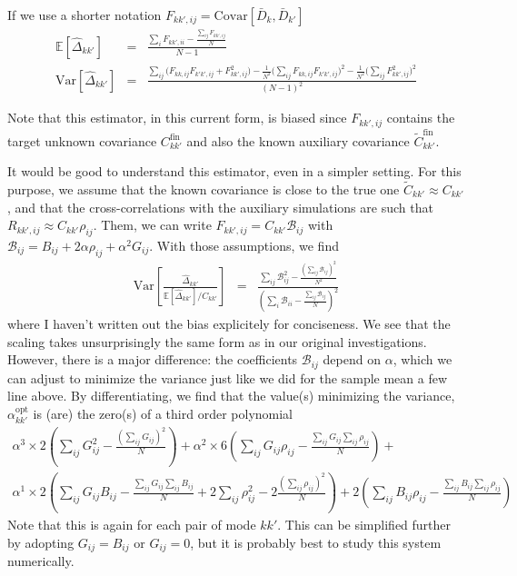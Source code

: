 \documentclass{aastex6}
\newcommand{\eqn}[1]{\begin{eqnarray}#1\end{eqnarray}}
\begin{document}
If we use a shorter notation $F_{kk',ij} = \mathrm{Covar}[\bar{D}_{k}, \bar{D}_{k'}]$
\eqn{
	\mathbb{E}[\hat{\Delta}_{kk'}] &=&  \frac{ \sum_{i}F_{kk',ii} - \frac{\sum_{ij} F_{kk',ij}}{N} } {N-1}	 \\	
	 \mathrm{Var}\left[ \hat{\Delta}_{kk'}\right]  &=&	\frac{\sum_{ij} \bigl(F_{kk,ij}F_{k'k',ij} + F_{kk',ij}^2 \bigr) - \frac{1}{N^2}\bigl( \sum_{ij}F_{kk,ij}F_{k'k',ij} \bigr)^2 - \frac{1}{N^2}\bigl( \sum_{ij}F^2_{kk',ij} \bigr)^2 }{(N-1)^2}	
	}
	
	Note that this estimator, in this current form, is biased since  $F_{kk',ij}$ contains the target unknown covariance ${C}_{kk'}^\mathrm{fin}$ and also the known auxiliary covariance $\tilde{C}_{kk'}^\mathrm{fin}$.
	
It would be good to understand this estimator, even in a simpler setting. For this purpose, we assume that the known covariance is close to the true one $\tilde{C}_{kk'} \approx {C}_{kk'}$, and that the cross-correlations with the auxiliary simulations are such that $R_{kk',ij} \approx {C}_{kk'} \rho_{ij}$.
Them, we can write $F_{kk',ij} ={C}_{kk'}  \mathcal{B}_{ij}$ with $\mathcal{B}_{ij} = B_{ij} + 2 \alpha \rho_{ij} + \alpha^2 G_{ij}$. 
With those assumptions, we find
\eqn{
	 \mathrm{Var}\left[ \frac{\hat{\Delta}_{kk'}}{\mathbb{E}[\hat{\Delta}_{kk'}] /{C}_{kk'} }\right]  &=&  \frac{ \sum_{ij} \mathcal{B}_{ij}^2  - \frac{\left(\sum_{ij}\mathcal{B}_{ij}\right)^2}{N^2}}{ \left(\sum_i \mathcal{B}_{ii} - \frac{\sum_{ij}\mathcal{B}_{ij}}{N}\right)^2 }
	}
where I haven't written out the bias explicitely for conciseness. 	
We see that the scaling takes unsurprisingly the same form as in our original investigations. However, there is a major difference: the coefficients $\mathcal{B}_{ij}$ depend on $\alpha$, which we can adjust to minimize the variance just like we did for the sample mean a few line above.
By differentiating, we find that the value(s) minimizing the variance, ${\alpha^\mathrm{opt}_{kk'}}$ is (are) the zero(s) of a third order polynomial
\eqn{
	 \alpha^3  \times 2 \left(  \sum_{ij} G_{ij}^2 - \frac{(\sum_{ij} G_{ij})^2}{N}\right) + 
	  \alpha^2 \times 6 \left(  \sum_{ij} G_{ij} \rho_{ij} - \frac{\sum_{ij} G_{ij} \sum_{ij} \rho_{ij}}{N} \right) + \\ 
	  \alpha^1 \times 2 \left(  \sum_{ij} G_{ij} B_{ij} - \frac{\sum_{ij} G_{ij} \sum_{ij} B_{ij}}{N}  + 2 \sum_{ij} \rho^2_{ij} - 2\frac{(\sum_{ij}  \rho_{ij})^2}{N}  \right) + 
	    2 \left(  \sum_{ij} B_{ij} \rho_{ij} - \frac{\sum_{ij} B_{ij} \sum_{ij} \rho_{ij}}{N}  \right)
}
Note that this is again for each pair of mode $kk'$. 
This can be simplified further by adopting $G_{ij}=B_{ij}$ or $G_{ij} = 0$, but it is probably best to study this system numerically.
\end{document}
